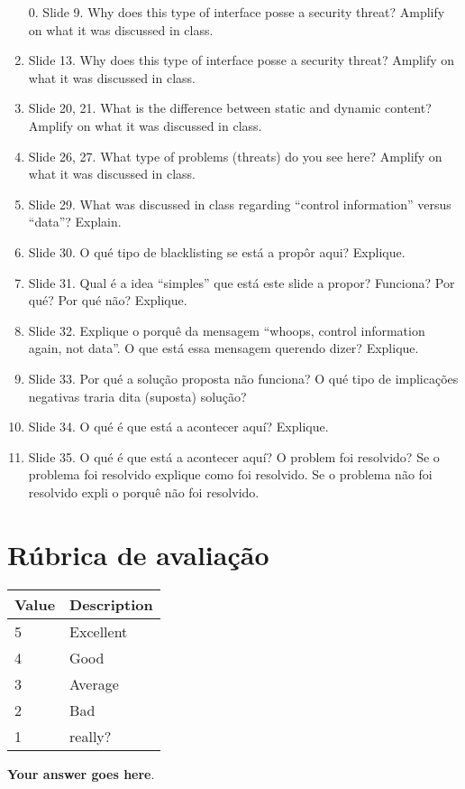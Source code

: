 \documentclass{article}
\begin{document}
\begin{enumerate}
\item[0.] Slide 9. Why does this type of interface posse a security
  threat? Amplify on what it was discussed in class. 
\item Slide 13. Why does this type of interface posse a security
  threat? Amplify on what it was discussed in class. 
\item Slide 20, 21. What is the difference between static and dynamic
  content?  Amplify on what it was discussed in class. 
\item Slide 26, 27. What type of problems (threats) do you see here? Amplify on what
  it was discussed in class. 
\item Slide 29. What was discussed in class regarding ``control
  information'' versus ``data''? Explain. 
\item Slide 30. O qué tipo de blacklisting se está a propôr aqui? Explique.
\item Slide 31. Qual é a idea ``simples'' que está este slide a propor? Funciona? Por qué?
  Por qué não? Explique.
\item Slide 32. Explique o porquê da mensagem ``whoops, control information again, not
  data''. O que está essa mensagem querendo dizer? Explique.
\item Slide 33. Por qué a solução proposta não funciona? O qué tipo de implicações
  negativas traria dita (suposta) solução? 
\item Slide 34. O qué é que está a acontecer aquí? Explique. 
\item Slide 35. O qué é que está a acontecer aquí? O problem foi resolvido? Se o
  problema foi resolvido explique como foi resolvido. Se o problema não foi resolvido
  expli o porquê não foi resolvido.
\end{enumerate}

\bigskip



\section*{Rúbrica de avaliação}

\begin{tabular}{|l|p{12cm}|} \hline
  \textbf{Value} & \textbf{Description} \\ \hline
  5 & Excellent \\ \hline
  4 & Good  \\ \hline 
  3 & Average  \\ \hline 
  2 & Bad \\ \hline 
  1 & really? \\ \hline 
\end{tabular}

\bigskip

\textbf{Your answer goes here}.
\end{document}
